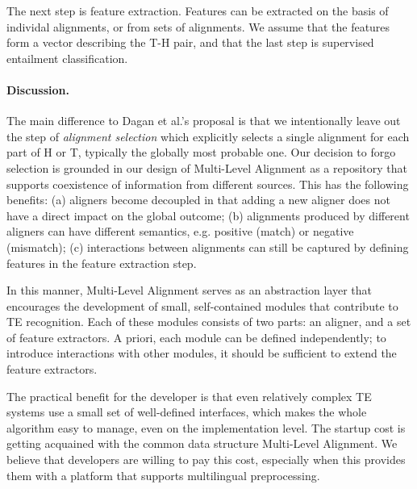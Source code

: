 \documentclass[11pt,letterpaper]{article}
\begin{document}
The next step is feature extraction. Features can be extracted on the
basis of individal alignments, or from sets of alignments. We assume
that the features form a vector describing the T-H pair, and that the
last step is supervised entailment classification.

\paragraph{Discussion.} The main difference to Dagan et al.'s proposal
is that we intentionally leave out the step of {\em alignment
  selection} which explicitly selects a single alignment for each part
of H or T, typically the globally most probable one. Our decision to
forgo selection is grounded in our design of Multi-Level Alignment as
a repository that supports coexistence of information from different
sources. This has the following benefits: (a) aligners become
decoupled in that adding a new aligner does not have a direct impact
on the global outcome; (b) alignments produced by different aligners
can have different semantics, e.g. positive (match) or negative
(mismatch); (c) interactions between alignments can still be captured
by defining features in the feature extraction step.

In this manner, Multi-Level Alignment serves as an abstraction layer
that encourages the development of small, self-contained modules that
contribute to TE recognition. Each of these modules consists of two
parts: an aligner, and a set of feature extractors. A priori, each
module can be defined independently; to introduce interactions with
other modules, it should be sufficient to extend the feature
extractors.

The practical benefit for the developer is that even relatively
complex TE systems use a small set of well-defined interfaces, which
makes the whole algorithm easy to manage, even on the implementation
level. The startup cost is getting acquained with the common data
structure Multi-Level Alignment. We believe that developers are
willing to pay this cost, especially when this provides them with a
platform that supports multilingual preprocessing.

\end{document}
